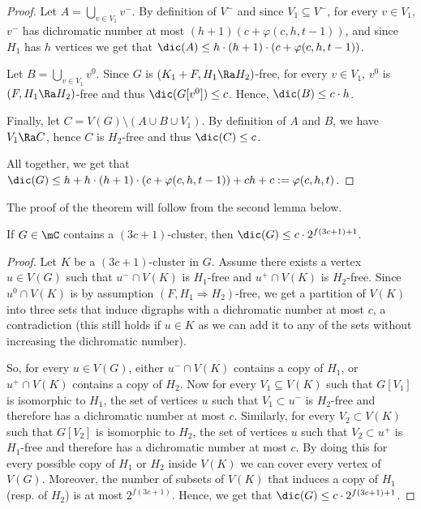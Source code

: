 \begin{proof}
        Let $A=\bigcup_{v \in V_1}v^-$. By definition of $V^-$ and since $V_1 \subseteq V^-$, for every $v \in V_1$, $v^-$ has dichromatic number at most $(h+1)(c+\varphi(c,h,t-1))$, and since $H_1$ has $h$ vertices we get that $\dic(A) \leq h \cdot (h+1) \cdot (c+\varphi(c,h,t-1))$.
        
        Let $B=\bigcup_{v \in V_1}v^0$. Since $G$ is $(K_1+F, H_1 \Ra H_2)$-free, for every $v \in V_1$, $v^0$ is $(F, H_1 \Ra H_2)$-free and thus $\dic(G[v^0]) \leq c$. Hence, $\dic(B) \leq c \cdot h$.  
        
        Finally, let $C = V(G) \setminus (A\cup B \cup V_1)$. By definition of $A$ and $B$, we have $V_1 \Ra C$, hence $C$ is $H_2$-free and thus $\dic(C) \leq c$.  

All together, we get that $\dic(G) \leq h + h \cdot (h+1) \cdot (c+\varphi(c,h,t-1)) + ch +c := \varphi(c,h,t)$. 


\end{proof}

The proof of the theorem will follow from the second lemma below.

\begin{lemma}\label{lemma:cluster}
If $G\in \mC$ contains a $(3c+1)$-cluster, then $\dic(G)\leq c \cdot 2^{f(3c+1)+1}$. 
\end{lemma}

\begin{proof}
Let $K$ be a $(3c+1)$-cluster in $G$. Assume there exists a vertex $u \in V(G)$ such that $u^-\cap V(K)$ is $H_1$-free and $u^+\cap V(K)$ is $H_2$-free. Since $u^0\cap V(K)$ is by assumption $(F , H_1 \Rightarrow H_2)$-free, we get a partition of $V(K)$ into three sets that induce digraphs with a dichromatic number at most $c$, a contradiction (this still holds if $u\in K$ as we can add it to any of the sets without increasing the dichromatic number).

So, for every $u \in V(G)$, either $u^-\cap V(K)$ contains a copy of $H_1$, or $u^+\cap V(K)$ contains a copy of $H_2$. 
Now for every $V_1\subseteq V(K)$ such that $G[V_1]$ is isomorphic to $H_1$, the set of vertices $u$ such that $V_1 \subset u^-$ is $H_2$-free and therefore has a dichromatic number at most $c$. 
Similarly, for every $V_2\subset V(K)$ such that $G[V_2]$ is isomorphic to $H_2$, the set of vertices $u$ such that $V_2 \subset u^+$ is $H_1$-free and therefore has a dichromatic number at most $c$.
By doing this for every possible copy of  $H_1$ or $H_2$ inside $V(K)$ we can cover every vertex of $V(G)$. 
Moreover, the number of subsets of $V(K)$ that induces a copy of $H_1$ (resp. of $H_2$) is at most $2^{f(3c+1)}$. Hence, we get that $\dic(G)\leq c \cdot 2^{f(3c+1)+1}$. 
\end{proof}



